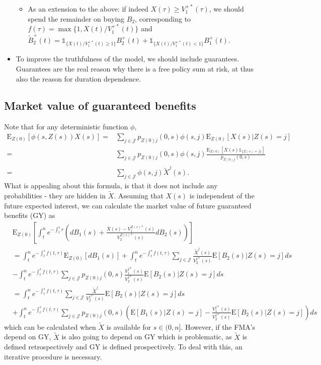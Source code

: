\documentclass[12pt]{article}
\newcommand{\E}{\text{E}}
\newcommand{\indic}[1]{\mathds{1}_{ \{ #1 \} }}
\begin{document}
\begin{itemize}
\begin{itemize}
\item As an extension to the above: if indeed $X(\tau)\geq V_1^{+*}(\tau)$, we should spend the remainder on buying $B_2$, corresponding to $f(\tau)=\max \{ 1, X(t)/V_1^{+*}(t) \}$ and $\tilde{B}_2^+(t)=\indic{ X(t)/V_1^{+*}(t) \geq 1} B_2^+(t)+\indic{ X(t)/V_1^{+*}(t)<1} B_1^+(t)$.
\end{itemize}
\item To improve the truthfulness of the model, we should include guarantees. Guarantees are the real reason why there is a free policy sum at risk, at thus also the reason for duration dependence.
\end{itemize}



\subsection*{Market value of guaranteed benefits}
Note that for any deterministic function $\phi$,
\begin{align*}
\E_{Z(0)} \left[  \phi(s,Z(s)) X(s) \right] =&
\sum_{j \in \mathcal{J}} p_{Z(0)j}(0,s) \phi(s,j) \E_{Z(0)}[  X(s) |Z(s)=j] 
\\
=&
\sum_{j \in \mathcal{J}} p_{Z(0)j}(0,s) \phi(s,j) \frac{\E_{Z(0)}[  X(s) \indic{Z(s)=j} ]}{p_{Z(0)j}(0,s)}
\\
=&
\sum_{j \in \mathcal{J}}  \phi(s,j) \tilde{X}^j(s).
\end{align*}
What is appealing about this formula, is that it does not include any probabilities - they are hidden in $\tilde{X}$. Assuming that $X(s)$ is independent of the future expected interest, we can calculate the market value of future guaranteed benefits (GY) as
\begin{align*}
&\E_{Z(0)} \left[ \int_t^n e^{-\int_t^s r} \left( dB_1(s)+ \frac{X(s)-V_1^{Z(s)*}(s)}{V_2^{Z(s)*}(s)}dB_2(s) \right) \right]
\\
&=
\int_t^n e^{-\int_t^s f(t,\tau)} \E_{Z(0)}[ dB_1(s)] 
+
\int_t^n e^{-\int_t^s f(t,\tau)} \sum_{j \in \mathcal{J}} \frac{\tilde{X}^j(s)}{V_2^{j*}(s)} \E[B_2(s)| Z(s)=j]ds  
\\
& -
\int_t^n e^{-\int_t^s f(t,\tau)} \sum_{j \in \mathcal{J}} p_{Z(0)j}(0,s)\frac{V_1^{j*}(s)}{V_2^{j*}(s)} \E[B_2(s)| Z(s)=j]ds
\\
&=
\int_t^n e^{-\int_t^s f(t,\tau)} \sum_{j \in \mathcal{J}} \frac{\tilde{X}^j}{V_2^{j*}(s)} \E[B_2(s)| Z(s)=j]ds  
\\
& +
\int_t^n e^{-\int_t^s f(t,\tau)} \sum_{j \in \mathcal{J}} p_{Z(0)j}(0,s)\left( \E[B_1(s)| Z(s)=j]-\frac{V_1^{j*}(s)}{V_2^{j*}(s)} \E[B_2(s)| Z(s)=j]  \right)ds
\end{align*}
which can be calculated when $\tilde{X}$ is available for $s \in (0,n]$. However, if the FMA's depend on GY, $\tilde{X}$ is also going to depend on GY which is problematic, as $\tilde{X}$ is defined retrospectively and GY is defined prospectively. To deal with this, an iterative procedure is necessary.
\end{document}
